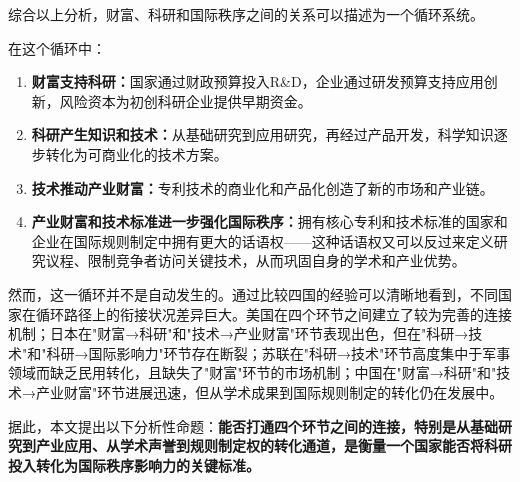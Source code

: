 综合以上分析，财富、科研和国际秩序之间的关系可以描述为一个循环系统。

在这个循环中：

\begin{enumerate}
  \item \textbf{财富支持科研：}国家通过财政预算投入R\&D，企业通过研发预算支持应用创新，风险资本为初创科研企业提供早期资金。
  \item \textbf{科研产生知识和技术：}从基础研究到应用研究，再经过产品开发，科学知识逐步转化为可商业化的技术方案。
  \item \textbf{技术推动产业财富：}专利技术的商业化和产品化创造了新的市场和产业链。
  \item \textbf{产业财富和技术标准进一步强化国际秩序：}拥有核心专利和技术标准的国家和企业在国际规则制定中拥有更大的话语权——这种话语权又可以反过来定义研究议程、限制竞争者访问关键技术，从而巩固自身的学术和产业优势。
\end{enumerate}

然而，这一循环并不是自动发生的。通过比较四国的经验可以清晰地看到，不同国家在循环路径上的衔接状况差异巨大。美国在四个环节之间建立了较为完善的连接机制；日本在"财富→科研"和"技术→产业财富"环节表现出色，但在"科研→技术"和"科研→国际影响力"环节存在断裂；苏联在"科研→技术"环节高度集中于军事领域而缺乏民用转化，且缺失了"财富"环节的市场机制；中国在"财富→科研"和"技术→产业财富"环节进展迅速，但从学术成果到国际规则制定的转化仍在发展中。

据此，本文提出以下分析性命题：\textbf{能否打通四个环节之间的连接，特别是从基础研究到产业应用、从学术声誉到规则制定权的转化通道，是衡量一个国家能否将科研投入转化为国际秩序影响力的关键标准。}
